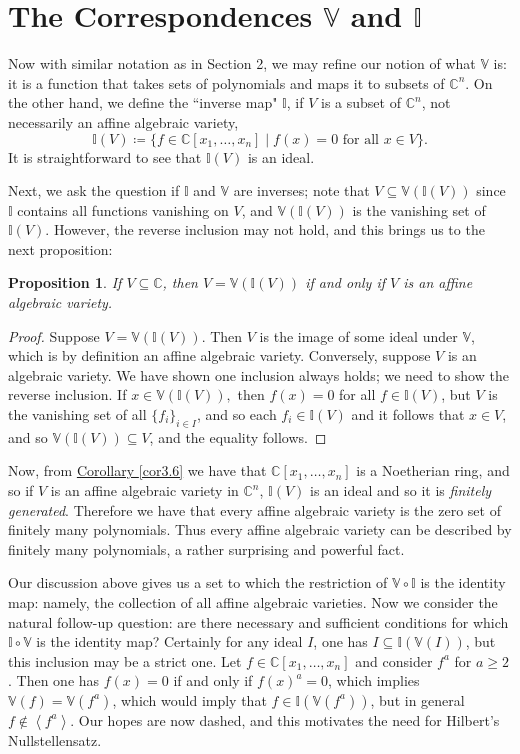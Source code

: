 \documentclass[letterpaper]{article}
\newtheorem{proposition}[theorem]{Proposition}
\theoremstyle{definition}
\theoremstyle{remark}
\newcommand\CC{\mathbb{C}}
\newcommand\VV{\mathbb{V}}
\newcommand\II{\mathbb{I}}
\newcommand{\defeq}{\coloneqq}
\newcommand{\abrackets}[1]{\left\langle#1\right\rangle}
\begin{document}
\section{The Correspondences \texorpdfstring{$\VV$}{V} and \texorpdfstring{$\II$}{I}}
Now with similar notation as in Section 2, we may refine our notion of what $\VV$ is: it is a function that takes sets of polynomials and maps it to subsets of $\CC^n$. On the other hand, we define the ``inverse map" $\II$, if $V$ is a subset of $\CC^n$, not necessarily an affine algebraic variety, \[\II(V)\defeq \{f\in\CC[x_1,\dots,x_n]\mid f(x)=0\text{ for all } x\in V\}.\] It is straightforward to see that $\II(V)$ is an ideal. 

Next, we ask the question if $\II$ and $\VV$ are inverses; note that $V\subseteq \VV(\II(V))$ since $\II$ contains all functions vanishing on $V$, and $\VV(\II(V))$ is the vanishing set of $\II(V)$. However, the reverse inclusion may not hold, and this brings us to the next proposition: \begin{proposition}
    If $V\subseteq \CC$, then $V=\VV(\II(V))$ if and only if $V$ is an affine algebraic variety. 
\end{proposition} \begin{proof}
    Suppose $V=\VV(\II(V))$. Then $V$ is the image of some ideal under $\VV$, which is by definition an affine algebraic variety. Conversely, suppose $V$ is an algebraic variety. We have shown one inclusion always holds; we need to show the reverse inclusion. If $x\in \VV(\II(V)),$ then $f(x)=0$ for all $f\in\II(V)$, but $V$ is the vanishing set of all $\{f_i\}_{i\in I}$, and so each $f_i\in \II(V)$ and it follows that $x\in V$, and so $\VV(\II(V))\subseteq V$, and the equality follows.
\end{proof} 

Now, from \hyperref[cor3.6]{Corollary \ref*{cor3.6}} we have that $\CC[x_1,\dots,x_n]$ is a Noetherian ring, and so if $V$ is an affine algebraic variety in $\CC^n$, $\II(V)$ is an ideal and so it is \textit{finitely generated}. Therefore we have that every affine algebraic variety is the zero set of finitely many polynomials. Thus every affine algebraic variety can be described by finitely many polynomials, a rather surprising and powerful fact. 

Our discussion above gives us a set to which the restriction of $\VV\circ \II$ is the identity map: namely, the collection of all affine algebraic varieties. Now we consider the natural follow-up question: are there necessary and sufficient conditions for which $\II\circ \VV$ is the identity map? Certainly for any ideal $I$, one has $I\subseteq \II(\VV(I))$, but this inclusion may be a strict one. Let $f\in\CC[x_1,\dots,x_n]$ and consider $f^a$ for $a\ge 2$. Then one has $f(x)=0$ if and only if $f(x)^a=0$, which implies $\VV(f)=\VV(f^a)$, which would imply that $f\in \II(\VV(f^a))$, but in general $f\notin \abrackets{f^a}$. Our hopes are now dashed, and this motivates the need for Hilbert's Nullstellensatz. 
\end{document}
